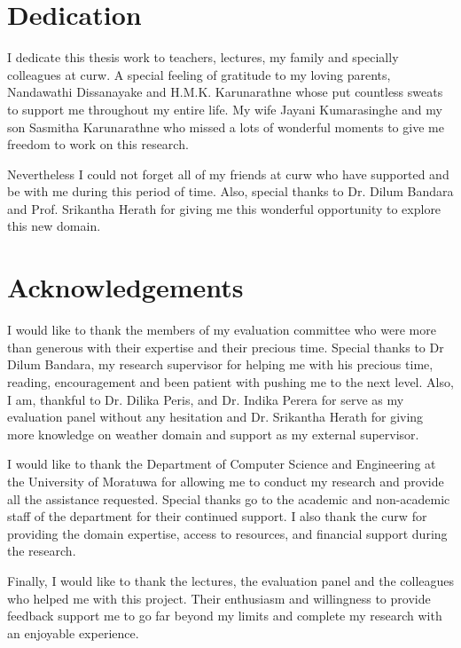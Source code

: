\documentclass[a4paper,oneside,12pt]{report}
\begin{document}
\restoregeometry
\normalsize

\chapter*{Dedication}
I dedicate this thesis work to teachers, lectures, my family and specially colleagues at \acrfull{curw}. A special feeling of gratitude to my loving parents, Nandawathi Dissanayake and H.M.K. Karunarathne whose put countless sweats to support me throughout my entire life. My wife Jayani Kumarasinghe and my son Sasmitha Karunarathne who missed a lots of wonderful moments to give me freedom to work on this research.

Nevertheless I could not forget all of my friends at \acrshort{curw} who have supported and be with me during this period of time. Also, special thanks to Dr. Dilum Bandara and Prof. Srikantha Herath for giving me this wonderful opportunity to explore this new domain.

\chapter*{Acknowledgements}
I would like to thank the members of my evaluation committee who were more than generous with their expertise and their precious time. Special thanks to Dr Dilum Bandara, my research supervisor for helping me with his precious time, reading, encouragement and been patient with pushing me to the next level. Also, I am, thankful to Dr. Dilika Peris, and Dr. Indika Perera for serve as my evaluation panel without any hesitation and Dr. Srikantha Herath for giving more knowledge on weather domain and support as my external supervisor.

I would like to thank the Department of Computer Science and Engineering at the University of Moratuwa for allowing me to conduct my research and provide all the assistance requested. Special thanks go to the academic and non-academic staff of the department for their continued support. I also thank the \acrfull{curw} for providing the domain expertise, access to resources, and financial support during the research.

Finally, I would like to thank the lectures, the evaluation panel and the colleagues who helped me with this project. Their enthusiasm and willingness to provide feedback support me to go far beyond my limits and complete my research with an enjoyable experience.
\end{document}
